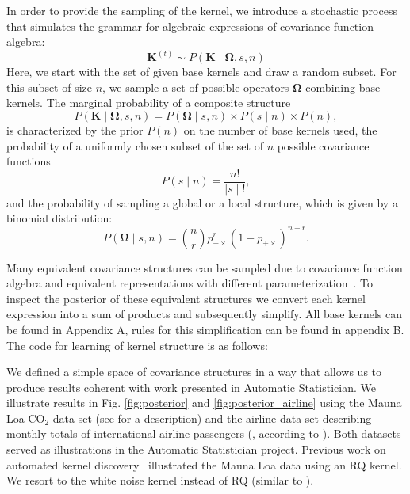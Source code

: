 In order to provide the sampling of the kernel, we introduce a stochastic process that simulates the grammar for algebraic expressions of covariance function algebra:
\begin{equation}
\mathbf{K}^{(t)} \sim  P(\mathbf{K} \mid \bm{\Omega},s,n)
\end{equation}
Here, we start with the set of given base kernels and draw a random subset.
For this subset of size $n$, we sample a set of possible operators $\bm{\Omega}$ combining base kernels. 
The marginal probability of a composite structure
\begin{equation}
P(\mathbf{K} \mid \bm{\Omega},s,n) = P(\bm{\Omega} \mid s,n)\times P(s \mid n) \times P(n),
\end{equation}
is characterized by the prior $P(n)$ on the number of base kernels used, the probability of a uniformly chosen subset of the set of $n$ possible covariance functions
\begin{equation}
\label{eq:subsets}
P(s \mid n) = \frac{n!}{ \mid s \mid !},
\end{equation}
and the probability of sampling a global or a local structure, which is given by a binomial distribution: 
\begin{equation}
P(\bm{\Omega} \mid s,n)= {n \choose r}  p_{+\times}^r (1 - p_{+\times})^{n-r}.
\end{equation}



Many equivalent covariance structures can be sampled due to covariance function algebra and equivalent representations with different parameterization~\citep{lloyd2014automatic}. To inspect the posterior of these equivalent structures we convert each kernel expression into a sum of products and subsequently simplify. All base kernels can be found in Appendix A, rules for this simplification can be found in appendix B. The code for learning of kernel structure is as follows:



We defined a simple space of covariance structures in a way that allows us to produce results coherent with 
work presented in Automatic Statistician. We illustrate results in Fig. \ref{fig:posterior} and \ref{fig:posterior_airline} using the Mauna Loa  CO$_2$ data set (see \citealp{rasmussen2006gaussian} for a description) and the airline data set describing monthly totals of international airline passengers (\citealp{box2011time}, according to \citealp{duvenaud2013structure}). Both datasets served as illustrations in the Automatic Statistician project. Previous work on automated kernel discovery~\citep{duvenaud2013structure} illustrated the Mauna Loa data using an RQ kernel.
We resort to the white noise kernel instead of RQ (similar to \citep{lloyd2014automatic}).

